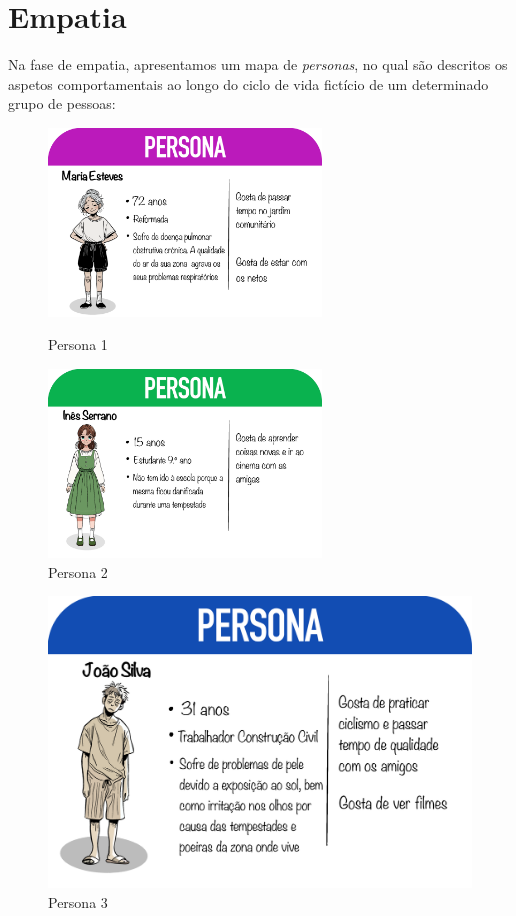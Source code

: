 \documentclass[a4paper, 11pt, onecolumn, oneside]{report}
\begin{document}
\section{Empatia}
Na fase de empatia, apresentamos um mapa de \textit{personas}, no qual são descritos os aspetos comportamentais ao longo do ciclo de vida fictício de um determinado grupo de pessoas:
\begin{figure}[ht]
    \centering
    \begin{minipage}{0.45\textwidth}
        \centering
        \includegraphics[height=5cm]{images/dona_maria_esteves.png}
        \caption{Persona 1}
        \label{fig:dona_maria_esteves}
    \end{minipage}
    \hfill
    \begin{minipage}{0.45\textwidth}
        \centering
        \includegraphics[height=5cm]{images/ines_serrano.png}
        \caption{Persona 2}
        \label{fig:ines_serrano}
    \end{minipage}
\end{figure}

\begin{figure}[ht]
    \centering
    \includegraphics[scale=0.17]{images/joao_silva_png.png}
    \caption{Persona 3}
    \label{fig:joao_silva}
\end{figure}
\end{document}
